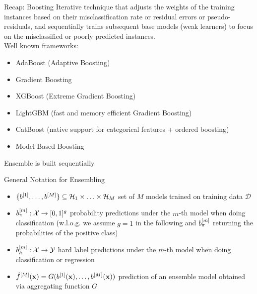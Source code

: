 \documentclass[11pt,compress,t,notes=noshow, aspectratio=169, xcolor=table]{beamer}
\begin{document}
\begin{vbframe}{Recap: Boosting}
Iterative technique that adjusts the weights of the training instances based on their misclassification rate or residual errors or pseudo-residuals, and sequentially trains subsequent base models (weak learners) to focus on the misclassified or poorly predicted instances.\\
\vspace{1em}
Well known frameworks:
\begin{itemize}
    \item AdaBoost (Adaptive Boosting)
    \item Gradient Boosting
    \item XGBoost (Extreme Gradient Boosting)
    \item LightGBM (fast and memory efficient Gradient Boosting)
    \item CatBoost (native support for categorical features + ordered boosting)
    \item Model Based Boosting
\end{itemize}
\vspace{1em}
Ensemble is built sequentially
\end{vbframe}


\begin{vbframe}{General Notation for Ensembling}
\begin{itemize}
    \item $\{b^{[1]}, \ldots, b^{[M]}\} \subseteq \mathcal{H}_{1} \times \ldots \times \mathcal{H}_{M}$ set of $M$ models trained on training data $\mathcal{D}$
    \item $b_{\pi}^{[m]}: \mathcal{X} \rightarrow [0, 1]^{g}$ probability predictions under the $m$-th model when doing classification (w.l.o.g. we assume $g = 1$ in the following and $b_{\pi}^{[m]}$ returning the probabilities of the positive class)
    \item $b_{h}^{[m]}: \mathcal{X} \rightarrow \mathcal{Y}$ hard label predictions under the $m$-th model when doing classification or regression
    \item $\hat{f}^{[M]}(\mathbf{x}) = G(b^{[1]}(\mathbf{x}), \ldots, b^{[M]}(\mathbf{x}))$ prediction of an ensemble model obtained via aggregating function $G$
\end{itemize}
\end{vbframe}
\end{document}
